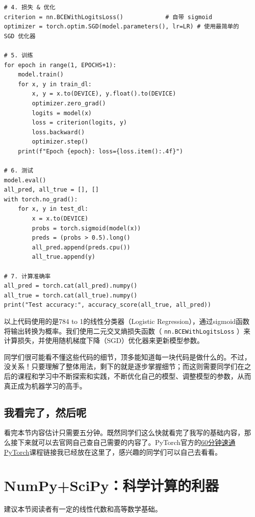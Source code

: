 \begin{verbatim}
# 4. 损失 & 优化
criterion = nn.BCEWithLogitsLoss()            # 自带 sigmoid
optimizer = torch.optim.SGD(model.parameters(), lr=LR) # 使用最简单的 SGD 优化器

# 5. 训练
for epoch in range(1, EPOCHS+1):
    model.train()
    for x, y in train_dl:
        x, y = x.to(DEVICE), y.float().to(DEVICE)
        optimizer.zero_grad()
        logits = model(x)
        loss = criterion(logits, y)
        loss.backward()
        optimizer.step()
    print(f"Epoch {epoch}: loss={loss.item():.4f}")

# 6. 测试
model.eval()
all_pred, all_true = [], []
with torch.no_grad():
    for x, y in test_dl:
        x = x.to(DEVICE)
        probs = torch.sigmoid(model(x))
        preds = (probs > 0.5).long()
        all_pred.append(preds.cpu())
        all_true.append(y)

# 7. 计算准确率
all_pred = torch.cat(all_pred).numpy()
all_true = torch.cat(all_true).numpy()
print("Test accuracy:", accuracy_score(all_true, all_pred))
\end{verbatim}

以上代码使用的是784 to 1的线性分类器（Logistic Regression），通过sigmoid函数将输出转换为概率。我们使用二元交叉熵损失函数（ \texttt{nn.BCEWithLogitsLoss} ）来计算损失，并使用随机梯度下降（SGD）优化器来更新模型参数。

同学们很可能看不懂这些代码的细节，顶多能知道每一块代码是做什么的。不过，没关系！只要理解了整体用法，剩下的就是逐步掌握细节；而这则需要同学们在之后的课程和学习中不断探索和实践，不断优化自己的模型、调整模型的参数，从而真正成为机器学习的高手。

\subsection{我看完了，然后呢}

看完本节内容估计只需要五分钟。既然同学们这么快就看完了我写的基础内容，那么接下来就可以去官网自己查自己需要的内容了。PyTorch官方的\href{https://docs.pytorch.org/tutorials/beginner/deep_learning_60min_blitz.html}{60分钟速通PyTorch}课程链接我已经放在这里了，感兴趣的同学们可以自己去看看。

\section{NumPy+SciPy：科学计算的利器}

\begin{flushright}
  {建议本节阅读者有一定的线性代数和高等数学基础。}
\end{flushright}

